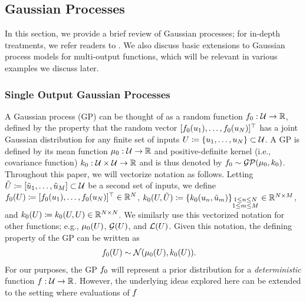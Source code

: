 \documentclass[12pt]{article}
\begin{document}
 \subsection{Gaussian Processes} \label{gp_review}
 In this section, we provide a brief review of Gaussian processes; for in-depth treatments, we refer 
 readers to \cite{gramacy2020surrogates, StuartTeck2, gpML}. We also discuss basic extensions
 to Gaussian process models for multi-output functions, which will be relevant in various examples
we discuss later.
 
 \subsubsection{Single Output Gaussian Processes}
 A Gaussian process (GP) can be thought of as a
random function $f_{0}: \mathcal{U} \to \mathbb{R}$, defined by the property that 
the random vector $[f_{0}(u_1), \dots, f_{0}(u_N)]^\top$ has
a joint Gaussian distribution for any finite set of inputs $U \coloneqq \{u_1, \dots, u_N\} \subset \mathcal{U}$. 
A GP is defined by its mean function $\mu_0: \mathcal{U} \to \mathbb{R}$ and positive-definite kernel
(i.e., covariance function) $k_0: \mathcal{U} \times \mathcal{U} \to \mathbb{R}$ and is thus denoted by 
$f_{0} \sim \mathcal{GP}(\mu_0, k_0)$. Throughout this paper, we will vectorize notation as follows. Letting 
$\tilde{U} \coloneqq [\tilde{u}_1, \dots, \tilde{u}_M]  \subset \mathcal{U}$ be a second set of inputs, we define 
$f_{0}(U) \coloneqq [f_{0}(u_1), \dots, f_{0}(u_N)]^\top \in \mathbb{R}^{N}$, 
$k_0(U, \tilde{U}) \coloneqq \{k_0(u_{n}, \tilde{u}_m)\}_{\substack{1 \leq n \leq N \\ 1 \leq m \leq M}} \in \mathbb{R}^{N \times M}$, 
and $k_0(U) \coloneqq k_0(U, U) \in \mathbb{R}^{N \times N}$. 
We similarly use this vectorized notation for other functions; e.g., $\mu_0(U)$, $\mathcal{G}(U)$, and $\mathcal{L}(U)$.
Given this notation, 
the defining property of the GP can be written as 
\begin{align}
f_{0}(U) &\sim \mathcal{N}(\mu_0(U), k_0(U)).
\end{align}
For our purposes, the GP $f_{0}$ will represent a prior distribution for a \textit{deterministic} function 
$f: \mathcal{U} \to \mathbb{R}$. 
However, the underlying ideas explored here can be extended to the setting where evaluations of $f$ 
\end{document}
